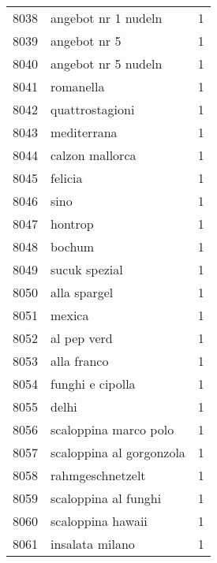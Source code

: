 \begin{tabular}{llr}
8038 &                                angebot nr 1 nudeln &      1 \\
8039 &                                       angebot nr 5 &      1 \\
8040 &                                angebot nr 5 nudeln &      1 \\
8041 &                                          romanella &      1 \\
8042 &                                    quattrostagioni &      1 \\
8043 &                                        mediterrana &      1 \\
8044 &                                    calzon mallorca &      1 \\
8045 &                                            felicia &      1 \\
8046 &                                               sino &      1 \\
8047 &                                            hontrop &      1 \\
8048 &                                             bochum &      1 \\
8049 &                                      sucuk spezial &      1 \\
8050 &                                       alla spargel &      1 \\
8051 &                                             mexica &      1 \\
8052 &                                        al pep verd &      1 \\
8053 &                                        alla franco &      1 \\
8054 &                                   funghi e cipolla &      1 \\
8055 &                                              delhi &      1 \\
8056 &                              scaloppina marco polo &      1 \\
8057 &                           scaloppina al gorgonzola &      1 \\
8058 &                                   rahmgeschnetzelt &      1 \\
8059 &                               scaloppina al funghi &      1 \\
8060 &                                  scaloppina hawaii &      1 \\
8061 &                                    insalata milano &      1 \\

\end{tabular}
